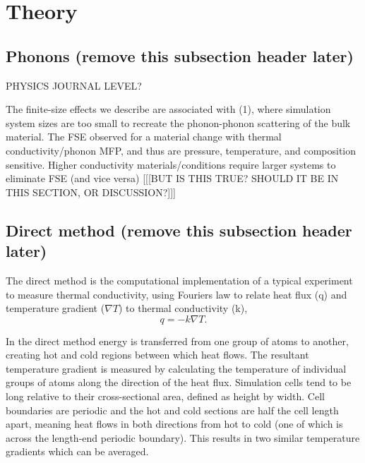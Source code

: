 \documentclass[%
preprint,                                  %
nofootinbib,
 amsmath,amssymb,
 aps,
]{revtex4-1}
\begin{document}
\section{\label{sec:theory}Theory}

\subsection{\label{sec:theory.phon}Phonons (remove this subsection header later)}

PHYSICS JOURNAL LEVEL? 

The finite-size effects we describe are associated with (1), where simulation system sizes are too small to recreate the phonon-phonon scattering of the bulk material. The FSE observed for a material change with thermal conductivity/phonon MFP, and thus are pressure, temperature, and composition sensitive. Higher conductivity materials/conditions require larger systems to eliminate FSE (and vice versa) [[[BUT IS THIS TRUE? SHOULD IT BE IN THIS SECTION, OR DISCUSSION?]]]




\subsection{\label{sec:theory.direct}Direct method (remove this subsection header later)}

The direct method is the computational implementation of a typical experiment to measure thermal conductivity, using Fourier\textsc{}s law to relate heat flux (q) and temperature gradient ($\nabla{T}$) to thermal conductivity (k), 
\begin{equation}
q=-k \nabla{T} \label{fourier}.
\end{equation}

In the direct method energy is transferred from one group of atoms to another, creating hot and cold regions between which heat flows. The resultant temperature gradient is measured by calculating the temperature of individual groups of atoms along the direction of the heat flux. Simulation cells tend to be long relative to their cross-sectional area, defined as height by width. %
Cell boundaries are periodic and the hot and cold sections are half the cell length apart, meaning heat flows in both directions from hot to cold (one of which is across the length-end periodic boundary). This results in two similar temperature gradients which can be averaged.
\end{document}
